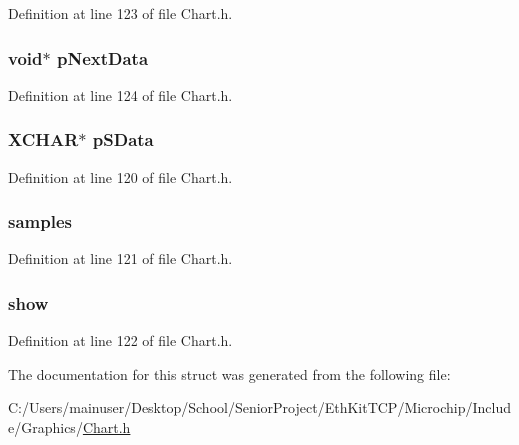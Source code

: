 Definition at line 123 of file Chart.\+h.

\hypertarget{struct_d_a_t_a_s_e_r_i_e_s_ad68e87fe62f00e55bf74a5f7ae784719}{}
\subsubsection[{p\+Next\+Data}]{\setlength{\rightskip}{0pt plus 5cm}void$\ast$ p\+Next\+Data}\label{struct_d_a_t_a_s_e_r_i_e_s_ad68e87fe62f00e55bf74a5f7ae784719}


Definition at line 124 of file Chart.\+h.

\hypertarget{struct_d_a_t_a_s_e_r_i_e_s_a2a5ec35e3a98031d8114e25ef37383b5}{}
\subsubsection[{p\+S\+Data}]{\setlength{\rightskip}{0pt plus 5cm}X\+C\+H\+A\+R$\ast$ p\+S\+Data}\label{struct_d_a_t_a_s_e_r_i_e_s_a2a5ec35e3a98031d8114e25ef37383b5}


Definition at line 120 of file Chart.\+h.

\hypertarget{struct_d_a_t_a_s_e_r_i_e_s_a70276314030d97259ec95114d4d1606d}{}
\subsubsection[{samples}]{ samples}\label{struct_d_a_t_a_s_e_r_i_e_s_a70276314030d97259ec95114d4d1606d}


Definition at line 121 of file Chart.\+h.

\hypertarget{struct_d_a_t_a_s_e_r_i_e_s_a11677dbf3ed4ae5e64818bde6496f0a3}{}
\subsubsection[{show}]{ show}\label{struct_d_a_t_a_s_e_r_i_e_s_a11677dbf3ed4ae5e64818bde6496f0a3}


Definition at line 122 of file Chart.\+h.



The documentation for this struct was generated from the following file\+:\begin{DoxyCompactItemize}
\item 
C\+:/\+Users/mainuser/\+Desktop/\+School/\+Senior\+Project/\+Eth\+Kit\+T\+C\+P/\+Microchip/\+Include/\+Graphics/\hyperlink{_chart_8h}{Chart.\+h}\end{DoxyCompactItemize}
